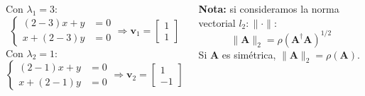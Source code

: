 \documentclass[9pt, aspectratio=169]{beamer}
\begin{document}
\begin{frame}
\begin{columns}[t]
Con $\lambda_1 = 3$:
\[ \begin{cases}
    (2 - 3) x + y &= 0 \\
    x + (2 - 3) y &= 0
\end{cases} \Longrightarrow \bm{v}_1 = \begin{bmatrix} 1 \\ 1 \end{bmatrix} 
\] \pause
Con $\lambda_2 = 1$:
\[ \begin{cases}
    (2 - 1) x + y &= 0 \\
    x + (2 - 1) y &= 0
\end{cases} \Longrightarrow \bm{v}_2 = \begin{bmatrix} 1 \\ -1 \end{bmatrix} 
\]
\hrulefill

\textbf{Nota:} si consideramos la norma vectorial $l_2: \lVert \cdot \rVert$:
\[ \lVert \bm{A} \rVert_2 = \rho(\bm{A}^{\dag} \bm{A})^{1/2} \]
Si $\bm{A}$ es simétrica, $\lVert \bm{A} \rVert_2 = \rho(\bm{A})$.
\end{columns}
\end{frame}
\end{document}
